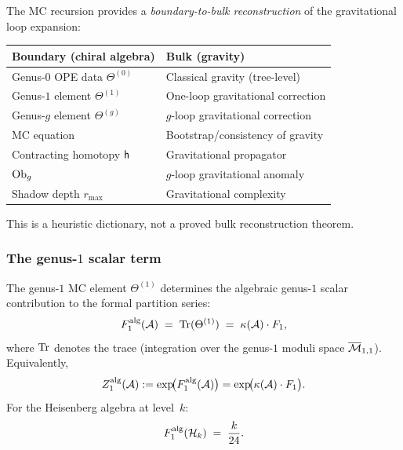 \begin{principle}
\label{princ:thqg-VII-gravity-bootstrap}
The MC recursion provides a \emph{boundary-to-bulk
reconstruction} of the gravitational loop expansion:
\begin{center}
\begin{tabular}{ll}
\textbf{Boundary (chiral algebra)} &
\textbf{Bulk (gravity)} \\
\hline
Genus-$0$ OPE data $\Theta^{(0)}$ &
Classical gravity (tree-level) \\
Genus-$1$ element $\Theta^{(1)}$ &
One-loop gravitational correction \\
Genus-$g$ element $\Theta^{(g)}$ &
$g$-loop gravitational correction \\
MC equation &
Bootstrap/consistency of gravity \\
Contracting homotopy $\mathsf{h}$ &
Gravitational propagator \\
$\mathrm{Ob}_g$ &
$g$-loop gravitational anomaly \\
Shadow depth $r_{\max}$ &
Gravitational complexity
\end{tabular}
\end{center}
This is a heuristic dictionary, not a proved bulk reconstruction
theorem.
\end{principle}

\subsubsection{The genus-\texorpdfstring{$1$}{1} scalar term}
\label{subsubsec:thqg-VII-one-loop}

\begin{theorem}
\label{thm:thqg-VII-one-loop-gravity}
The genus-$1$ MC element $\Theta^{(1)}$ determines the algebraic
genus-$1$ scalar contribution to the formal partition series:
\begin{equation}\label{eq:thqg-VII-one-loop}
F_1^{\mathrm{alg}}(\mathcal{A})
\;=\;
\operatorname{Tr}(\Theta^{(1)})
\;=\;
\kappa(\mathcal{A}) \cdot F_1,
\end{equation}
where $\operatorname{Tr}$ denotes the trace (integration over the genus-$1$
moduli space $\overline{\mathcal{M}}_{1,1}$). Equivalently,
\[
Z_1^{\mathrm{alg}}(\mathcal{A}):=\exp\!\bigl(F_1^{\mathrm{alg}}(\mathcal{A})\bigr)
= \exp\!\bigl(\kappa(\mathcal{A})\cdot F_1\bigr).
\]
For the Heisenberg
algebra at level~$k$:
\begin{equation}\label{eq:thqg-VII-one-loop-heis}
F_1^{\mathrm{alg}}(\mathcal{H}_k)
\;=\;
\frac{k}{24}.
\end{equation}
\end{theorem}

